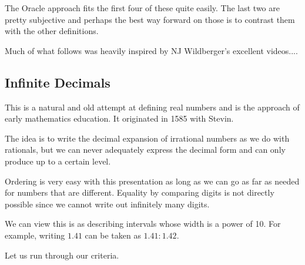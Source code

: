 \documentclass[12pt]{article}
\theoremstyle{remark}
\begin{document}
The Oracle approach fits the first four of these quite easily. The last two are pretty subjective and perhaps the best way forward on those is to contrast them with the other definitions. 

Much of what follows was heavily inspired by NJ Wildberger's excellent videos....


\subsection{Infinite Decimals}

This is a natural and old attempt at defining real numbers and is the approach of early mathematics education. It originated in 1585 with Stevin. 

The idea is to write the decimal expansion of irrational numbers as we do with rationals, but we can never adequately express the decimal form and can only produce up to a certain level. 

Ordering is very easy with this presentation as long as we can go as far as needed for numbers that are different. Equality by comparing digits is not directly possible since we cannot write out infinitely many digits. 

We can view this is as describing intervals whose width is a power of 10. For example, writing $1.41$ can be taken as $1.41:1.42$. 

Let us run through our criteria. 
\end{document}
